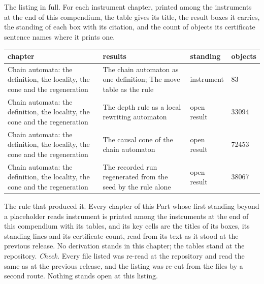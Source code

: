 \begin{chproof}[instrument]
The listing in full. For each instrument chapter, printed among the instruments at the end of this compendium, the table gives its title, the result boxes it carries, the standing of each box with its citation, and the count of objects its certificate sentence names where it prints one.
{\small
\begin{longtable}{p{38mm}p{63mm}p{30mm}p{14mm}}
\hline
chapter & results & standing & objects \\
\hline
\endhead
Chain automata: the definition, the locality, the cone and the regeneration & The chain automaton as one definition; The move table as the rule & instrument & 83 \\
Chain automata: the definition, the locality, the cone and the regeneration & The depth rule as a local rewriting automaton & open result & 33094 \\
Chain automata: the definition, the locality, the cone and the regeneration & The causal cone of the chain automaton & open result & 72453 \\
Chain automata: the definition, the locality, the cone and the regeneration & The recorded run regenerated from the seed by the rule alone & open result & 38067 \\
\hline
\end{longtable}
}
The rule that produced it. Every chapter of this Part whose first standing beyond a placeholder reads instrument is printed among the instruments at the end of this compendium with its tables, and its key cells are the titles of its boxes, its standing lines and its certificate count, read from its text as it stood at the previous release.
No derivation stands in this chapter; the tables stand at the repository.
\emph{Check.} Every file listed was re-read at the repository and read the same as at the previous release, and the listing was re-cut from the files by a second route.
Nothing stands open at this listing.
\end{chproof}
\label{chend:II-L-the-instrument-tables-at-the-repository}
